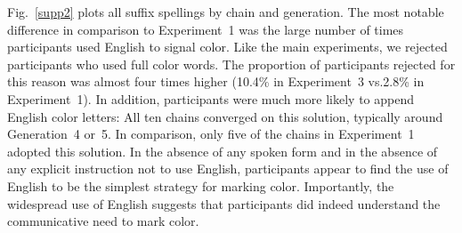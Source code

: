 \documentclass[doc,biblatex]{apa7}
\begin{document}
Fig.~\ref{supp2} plots all suffix spellings by chain and generation. The most notable difference in comparison to Experiment~1 was the large number of times participants used English to signal color. Like the main experiments, we rejected participants who used full color words. The proportion of participants rejected for this reason was almost four times higher (10.4\% in Experiment~3 vs.\@ 2.8\% in Experiment~1). In addition, participants were much more likely to append English color letters: All ten chains converged on this solution, typically around Generation~4 or~5. In comparison, only five of the chains in Experiment~1 adopted this solution. In the absence of any spoken form and in the absence of any explicit instruction not to use English, participants appear to find the use of English to be the simplest strategy for marking color. Importantly, the widespread use of English suggests that participants did indeed understand the communicative need to mark color.
\end{document}
